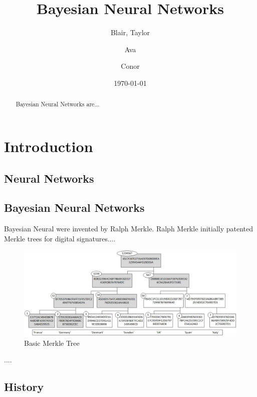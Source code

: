 \documentclass[12pt]{article}
\title{Bayesian Neural Networks}
\author{
	Blair, Taylor\\
	\and
	Ava\\
	\and
	Conor\\
}
\date{\today}
\begin{document}
\doublespacing
\maketitle



\begin{abstract}
	Bayesian Neural Networks are...
\end{abstract}

\tableofcontents

\section{Introduction}

\subsection{Neural Networks}


\subsection{Bayesian Neural Networks}

Bayesian Neural were invented by Ralph Merkle. Ralph Merkle initially patented Merkle trees for digital signatures....

\begin{figure}[H]
	\centering
	\includegraphics[width=.8\textwidth]{../Images/merkle-example.png}
	\caption{Basic Merkle Tree\cite{wikipedia-merkle-tree}}
\end{figure}


....


\subsection{History}
\end{document}
